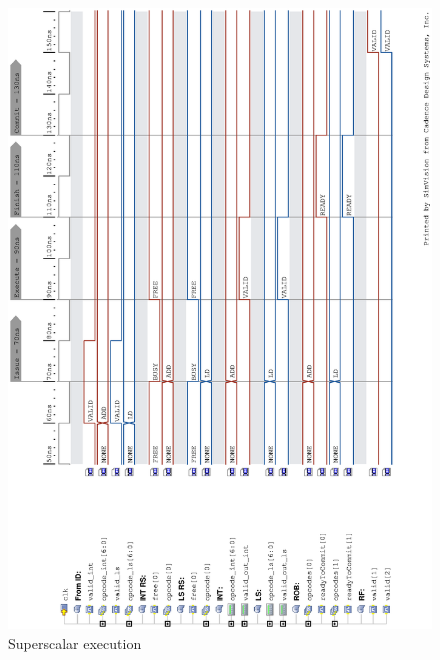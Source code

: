 \documentclass[12pt,a4paper]{article} %
\begin{document}
\begin{figure}[!p]
	\centering
	\includegraphics[width=\textwidth, trim = {1.5cm 1.5cm 1.5cm 1.5cm}]{Source/Waveforms/superscalarity.eps}
	\caption{Superscalar execution} 
	\label{fig-superscalarity}
\end{figure}

\newpage
\end{document}
